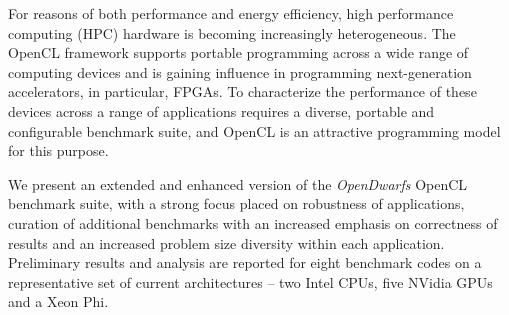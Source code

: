 \documentclass[../document.tex]{subfiles}
\begin{document}
For reasons of both performance and energy efficiency, high performance computing (HPC) hardware is becoming increasingly heterogeneous.
The OpenCL framework supports portable programming across a wide range of computing devices and is gaining influence in programming next-generation accelerators, in particular, FPGAs.
To characterize the performance of these devices across a range of applications requires a diverse, portable and configurable benchmark suite, and OpenCL is an attractive programming model for this purpose.


We present an extended and enhanced version of the \emph{OpenDwarfs} OpenCL benchmark suite, with a strong focus placed on robustness of applications, curation of additional benchmarks with an increased emphasis on correctness of results and an increased problem size diversity within each application.
Preliminary results and analysis are reported for eight benchmark codes on a representative set of current architectures -- two Intel CPUs, five NVidia GPUs and a Xeon Phi.



\end{document}
